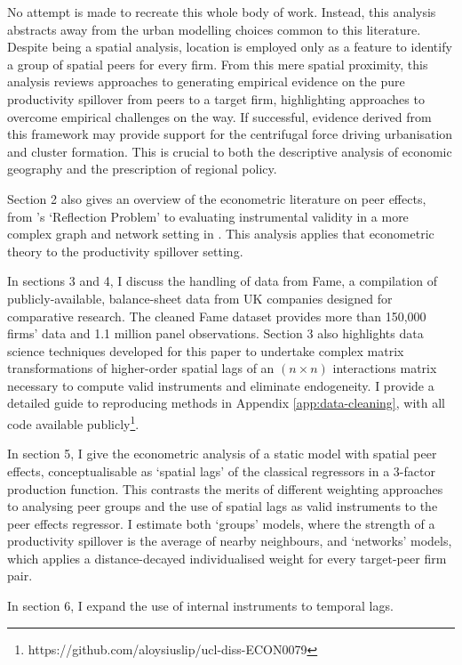 No attempt is made to recreate this whole body of work.
Instead, this analysis abstracts away from the urban modelling choices
common to this literature. Despite being a spatial analysis,
location is employed only as a feature to identify a group of spatial peers for every firm.
From this mere spatial proximity, this analysis reviews approaches to generating empirical evidence
on the pure productivity spillover from peers to a target firm,
highlighting approaches to overcome empirical challenges on the way.
If successful, evidence derived from this framework may provide 
support for the centrifugal force driving urbanisation and cluster formation.
This is crucial to both the descriptive analysis of economic geography
and the prescription of regional policy.
\par
Section 2 also gives an overview of the econometric literature
on peer effects, from \cite{Manski1993}'s `Reflection Problem'
to evaluating instrumental validity in a more complex graph and network setting in \cite{Bramoulle2009}.
This analysis applies that econometric theory to the productivity spillover setting.
\par
In sections 3 and 4, I discuss the handling of data from Fame,
a compilation of publicly-available, balance-sheet data from UK companies
designed for comparative research. The cleaned Fame dataset
provides more than 150,000 firms' data and 1.1 million panel observations.
Section 3 also highlights data science techniques developed for this paper
to undertake complex matrix transformations of higher-order spatial lags of
an $(n\times n)$ interactions matrix necessary to compute valid instruments
and eliminate endogeneity.
I provide a detailed guide to reproducing methods in Appendix \ref{app:data-cleaning},
with all code available publicly\footnote{https://github.com/aloysiuslip/ucl-diss-ECON0079}.
\par
In section 5, I give the econometric analysis of a static model with spatial peer effects,
conceptualisable as `spatial lags' of the classical regressors in a 3-factor production function.
This contrasts the merits of different weighting approaches to analysing peer groups
and the use of spatial lags as valid instruments to the peer effects  regressor.
I estimate both `groups' models, where the strength of a productivity spillover
is the average of nearby neighbours, and `networks' models,
which applies a distance-decayed individualised weight for every target-peer firm pair.
\par
In section 6, I expand the use of internal instruments to temporal lags.
